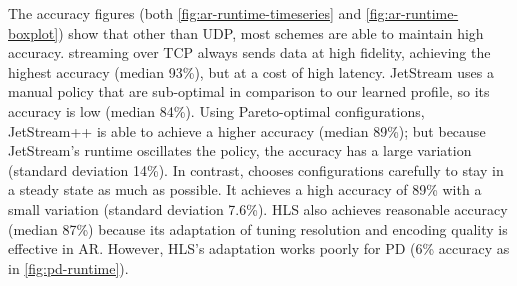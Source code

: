 
The accuracy figures (both \autoref{fig:ar-runtime-timeseries} and
\autoref{fig:ar-runtime-boxplot}) show that other than UDP, most schemes are
able to maintain high accuracy. streaming over TCP always sends data at high
fidelity, achieving the highest accuracy (median 93\%), but at a cost of high
latency. JetStream uses a manual policy that are sub-optimal in comparison to
our learned profile, so its accuracy is low (median 84\%). Using Pareto-optimal
configurations, JetStream++ is able to achieve a higher accuracy (median 89\%);
but because JetStream's runtime oscillates the policy, the accuracy has a large
variation (standard deviation 14\%). In contrast, \sysname{} chooses
configurations carefully to stay in a steady state as much as possible.  It
achieves a high accuracy of 89\% with a small variation (standard deviation
7.6\%). HLS also achieves reasonable accuracy (median 87\%) because its
adaptation of tuning resolution and encoding quality is effective in
AR. However, HLS's adaptation works poorly for PD (6\% accuracy as in
\autoref{fig:pd-runtime}).


